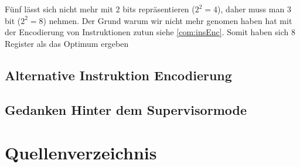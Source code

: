 \documentclass{scrartcl}
\begin{document}
Fünf lässt sich nicht mehr mit $2$ bits repräsentieren ($2^2 = 4$), daher muss man $3$ bit ($2^2 = 8$) nehmen. Der Grund warum wir nicht mehr genomen haben hat mit der Encodierung von Instruktionen zutun siehe \autoref{com:insEnc}. Somit haben sich $8$ Register als das Optimum ergeben

\subsection{\label{com:insEnc}Alternative Instruktion Encodierung}

\subsection{\label{com:sup}Gedanken Hinter dem Supervisormode}

\section{Quellenverzeichnis}

\printbibliography{}
\end{document}
